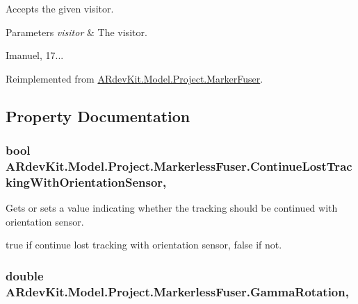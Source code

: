 Accepts the given visitor. 


\begin{DoxyParams}{Parameters}
{\em visitor} & The visitor.\\
\hline
\end{DoxyParams}


Imanuel, 17... 

Reimplemented from \hyperlink{class_a_rdev_kit_1_1_model_1_1_project_1_1_marker_fuser_af578e1415404a6b16c67607e3e5ea059}{A\-Rdev\-Kit.\-Model.\-Project.\-Marker\-Fuser}.



\subsection{Property Documentation}
\hypertarget{class_a_rdev_kit_1_1_model_1_1_project_1_1_markerless_fuser_a3c2dc4e70445338e8cd8e6f1aefca9c4}{
\subsubsection[{Continue\-Lost\-Tracking\-With\-Orientation\-Sensor}]{\setlength{\rightskip}{0pt plus 5cm}bool A\-Rdev\-Kit.\-Model.\-Project.\-Markerless\-Fuser.\-Continue\-Lost\-Tracking\-With\-Orientation\-Sensor\hspace{0.3cm}{\ttfamily [get]}, {\ttfamily [set]}}}\label{class_a_rdev_kit_1_1_model_1_1_project_1_1_markerless_fuser_a3c2dc4e70445338e8cd8e6f1aefca9c4}


Gets or sets a value indicating whether the tracking should be continued with orientation sensor. 

true if continue lost tracking with orientation sensor, false if not. \hypertarget{class_a_rdev_kit_1_1_model_1_1_project_1_1_markerless_fuser_a32b4cbef64b239fe38c7b107158edd85}{
\subsubsection[{Gamma\-Rotation}]{\setlength{\rightskip}{0pt plus 5cm}double A\-Rdev\-Kit.\-Model.\-Project.\-Markerless\-Fuser.\-Gamma\-Rotation\hspace{0.3cm}{\ttfamily [get]}, {\ttfamily [set]}}}\label{class_a_rdev_kit_1_1_model_1_1_project_1_1_markerless_fuser_a32b4cbef64b239fe38c7b107158edd85}



